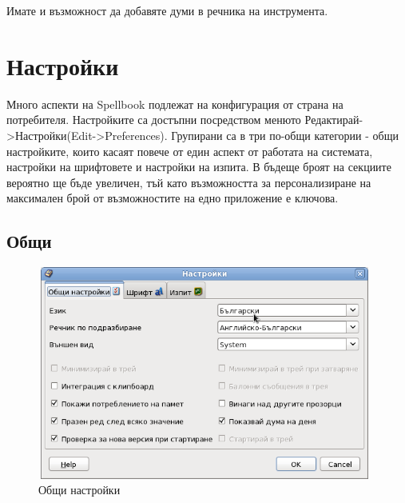 Имате и възможност да добавяте думи в речника на инструмента.
\section{Настройки}
Много аспекти на Spellbook подлежат на конфигурация от страна на
потребителя. Настройките са достъпни посредством менюто
Редактирай->Настройки(Edit->Preferences). Групирани са в три по-общи
категории - общи настройките, които касаят повече от един аспект от
работата на системата, настройки на шрифтовете и настройки на
изпита. В бъдеще броят на секциите вероятно ще бъде увеличен, тъй като
възможността за персонализиране на максимален брой от възможностите на
едно приложение е ключова.
\subsection{Общи}
\begin{figure}[htbp]
  \caption{Общи настройки}
  \centering
  \includegraphics[width=110mm, height=70mm]{images/general_preferences.png}
\end{figure}

